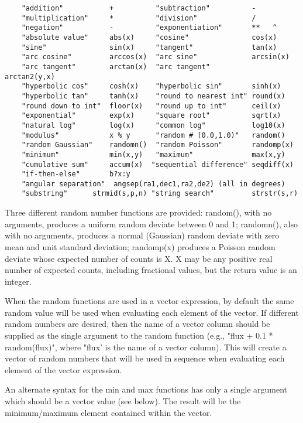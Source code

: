 \documentclass[11pt]{book}
\begin{document}
\begin{verbatim}
    "addition"           +          "subtraction"          -
    "multiplication"     *          "division"             /
    "negation"           -          "exponentiation"       **   ^
    "absolute value"     abs(x)     "cosine"               cos(x)
    "sine"               sin(x)     "tangent"              tan(x)
    "arc cosine"         arccos(x)  "arc sine"             arcsin(x)
    "arc tangent"        arctan(x)  "arc tangent"          arctan2(y,x)
    "hyperbolic cos"     cosh(x)    "hyperbolic sin"       sinh(x)
    "hyperbolic tan"     tanh(x)    "round to nearest int" round(x)
    "round down to int"  floor(x)   "round up to int"      ceil(x)
    "exponential"        exp(x)     "square root"          sqrt(x)
    "natural log"        log(x)     "common log"           log10(x)
    "modulus"            x % y      "random # [0.0,1.0)"   random()
    "random Gaussian"    randomn()  "random Poisson"       randomp(x)
    "minimum"            min(x,y)   "maximum"              max(x,y)
    "cumulative sum"     accum(x)  "sequential difference" seqdiff(x)
    "if-then-else"       b?x:y
    "angular separation"  angsep(ra1,dec1,ra2,de2) (all in degrees)
    "substring"      strmid(s,p,n) "string search"         strstr(s,r)
\end{verbatim}
Three different random number functions are provided:  random(), with no
arguments, produces a uniform random deviate between 0 and 1; randomn(),
also with no arguments, produces a normal (Gaussian) random deviate  with
zero mean and unit standard deviation; randomp(x) produces a Poisson random
deviate whose expected number of counts is X.  X may be any positive real
number of expected counts, including fractional values, but the return value
is an integer.

When the random functions are used in a vector expression, by default
the same random value will be used when evaluating each element of the vector.
If different random numbers are desired, then the name of a vector
column should be supplied as the single argument to the random
function (e.g., "flux + 0.1 * random(flux)", where "flux' is the
name of a vector column).  This will create a vector of
random numbers that will be used in sequence when evaluating each
element of the vector expression.

    An alternate syntax for the min and max functions  has only a single
    argument which  should be  a  vector value (see  below).  The result
    will be the minimum/maximum element contained within the vector.
\end{document}
